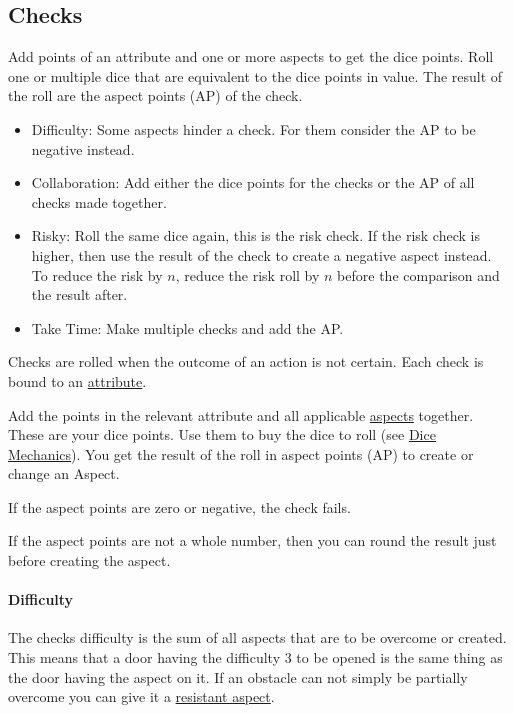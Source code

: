 \documentclass[11pt]{article}
\begin{document}
{\subsection{Checks}
\label{sec:org79b32ad}
\begin{short}
Add points of an attribute and one or more aspects to get the dice points. Roll one or multiple dice that are equivalent to the dice points in value. The result of the roll are the aspect points (AP) of the check.
\begin{itemize}
\item Difficulty: Some aspects hinder a check. For them consider the AP to be negative instead.
\item Collaboration: Add either the dice points for the checks or the AP of all checks made together.
\item Risky: Roll the same dice again, this is the risk check. If the risk check is higher, then use the result of the check to create a negative aspect instead. To reduce the risk by \(n\), reduce the risk roll by \(n\) before the comparison and the result after.
\item Take Time: Make multiple checks and add the AP.
\end{itemize}
\end{short}

Checks are rolled when the outcome of an action is not certain. Each check is bound to an \hyperref[sec:orgefe173e]{attribute}.

Add the points in the relevant attribute and all applicable \hyperref[sec:org514182e]{aspects} together. These are your dice points. Use them to buy the dice to roll (see \hyperref[sec:org2ebde8f]{Dice Mechanics}). You get the result of the roll in aspect points (AP) to create or change an Aspect.

If the aspect points are zero or negative, the check fails.

If the aspect points are not a whole number, then you can round the result just before creating the aspect.
\paragraph*{Difficulty}
\label{sec:orgaf8e685}
The checks difficulty is the sum of all aspects that are to be overcome or created. This means that a door having the difficulty 3 to be opened is the same thing as the door having the aspect  on it. If an obstacle can not simply be partially overcome you can give it a \hyperref[sec:org647b490]{resistant aspect}.

}
\end{document}

